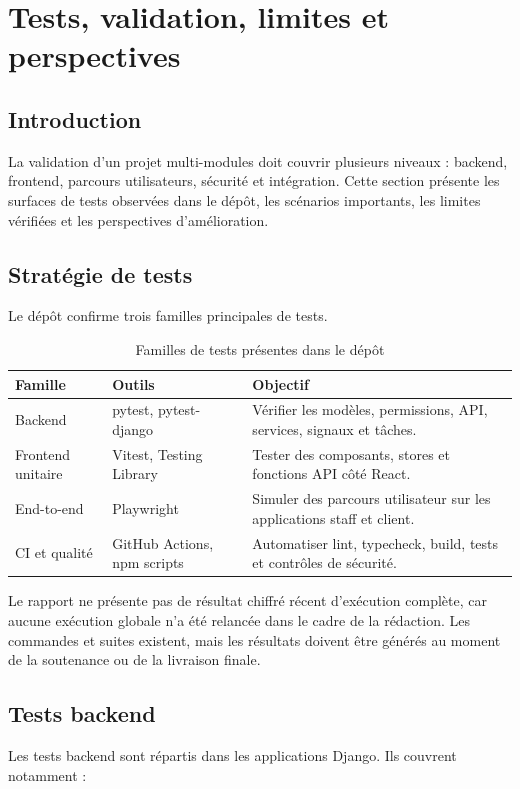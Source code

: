\chapter{Tests, validation, limites et perspectives}
\label{chap:tests}

\section*{Introduction}
La validation d'un projet multi-modules doit couvrir plusieurs niveaux : backend, frontend, parcours utilisateurs, sécurité et intégration. Cette section présente les surfaces de tests observées dans le dépôt, les scénarios importants, les limites vérifiées et les perspectives d'amélioration.

\section{Stratégie de tests}
Le dépôt confirme trois familles principales de tests.

\begin{table}[H]
\centering
\caption{Familles de tests présentes dans le dépôt}
\label{tab:familles-tests}
\begin{tabularx}{\textwidth}{p{3.4cm}p{4cm}Y}
\toprule
\textbf{Famille} & \textbf{Outils} & \textbf{Objectif} \\
\midrule
Backend & pytest, pytest-django & Vérifier les modèles, permissions, API, services, signaux et tâches. \\
Frontend unitaire & Vitest, Testing Library & Tester des composants, stores et fonctions API côté React. \\
End-to-end & Playwright & Simuler des parcours utilisateur sur les applications staff et client. \\
CI et qualité & GitHub Actions, npm scripts & Automatiser lint, typecheck, build, tests et contrôles de sécurité. \\
\bottomrule
\end{tabularx}
\end{table}

Le rapport ne présente pas de résultat chiffré récent d'exécution complète, car aucune exécution globale n'a été relancée dans le cadre de la rédaction. Les commandes et suites existent, mais les résultats doivent être générés au moment de la soutenance ou de la livraison finale.

\section{Tests backend}
Les tests backend sont répartis dans les applications Django. Ils couvrent notamment :

